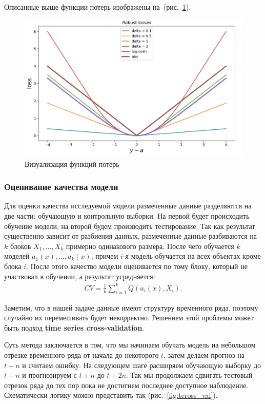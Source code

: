 \documentclass[12pt,a4paper]{article} %
\begin{document}
Описанные выше функции потерь изображены на~(рис.~\ref{fig:loss_func}).

\begin{figure}[h]
	
	\centering
	
	\includegraphics[width=0.7\linewidth]{loss_func.jpg}
	
	\caption{Визуализация функций потерь}
	
	\label{fig:loss_func}
	
\end{figure}

\subsubsection{Оценивание качества модели}

Для оценки качества исследуемой модели размеченные данные разделяются на две части: обучающую и контрольную выборки. На первой будет происходить обучение модели, на второй будем производить тестирование. Так как результат существенно зависит от разбиения данных, размеченные данные разбиваются на $k$ блоков $X_1, \dots, X_k$ примерно одинакового размера. После чего обучается $k$ моделей $a_1(x), \dots, a_k(x)$, причем $i$-я модель обучается на всех объектах кроме блока $i$. После этого качество модели оценивается по тому блоку, который не участвовал в обучении, а результат усредняется:
 \begin{gather}\label{modelquality}
	CV = \frac{1}{k}\sum\limits_{i=1}^{k}Q(a_i(x), X_i).
\end{gather}

Заметим, что в нашей задаче данные имеют структуру временного ряда, поэтому случайно их перемешивать будет некорректно. Решением этой проблемы может быть подход \textbf{time series cross-validation}.

Суть метода заключается в том, что мы начинаем обучать модель на небольшом отрезке временного ряда от начала до некоторого $t$, затем делаем прогноз на $t+n$ и считаем ошибку. На следующем шаге расширяем обучающую выборку до $t+n$ и прогнозируем с $t+n$ до $t+2n$. Так мы продолжаем сдвигать тестовый отрезок ряда до тех пор пока не достигнем последнее доступное наблюдение. Схематически логику можно представить так (рис.~\ref{fig:tcross_val}). 
\end{document}
